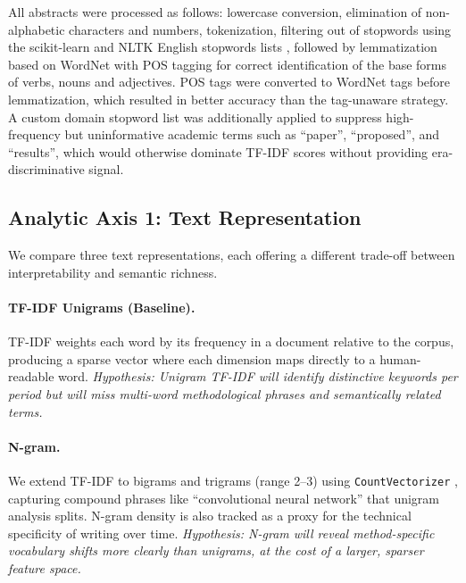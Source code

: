 \documentclass{article}
\begin{document}
All abstracts were processed as follows:
lowercase conversion, elimination of non-alphabetic
characters and numbers, tokenization, filtering out of
stopwords using the scikit-learn and NLTK English stopwords lists
\citep{scikit-learn, nltk}, followed by
lemmatization based on WordNet with POS tagging for correct
identification of the base forms of verbs, nouns and adjectives.
POS tags were converted to WordNet tags before
lemmatization, which resulted in better accuracy than
the tag-unaware strategy. A custom domain stopword list was additionally
applied to suppress high-frequency but uninformative
academic terms such as ``paper'', ``proposed'', and
``results'', which would otherwise dominate TF-IDF scores
without providing era-discriminative signal.

\subsection{Analytic Axis 1: Text Representation}
\label{subsec:representation}

We compare three text representations, each offering a
different trade-off between interpretability and semantic
richness.

\paragraph{TF-IDF Unigrams (Baseline).}
TF-IDF weights each word by its frequency in a document
relative to the corpus, producing a sparse vector where
each dimension maps directly to a human-readable word.
\textit{Hypothesis: Unigram TF-IDF will identify
distinctive keywords per period but will miss multi-word
methodological phrases and semantically related terms.}

\paragraph{N-gram.}
We extend TF-IDF to bigrams and trigrams (range 2--3)
using \texttt{CountVectorizer} \citep{scikit-learn},
capturing compound phrases like ``convolutional neural
network'' that unigram analysis splits. N-gram density
is also tracked as a proxy for the technical specificity
of writing over time.
\textit{Hypothesis: N-gram will reveal
method-specific vocabulary shifts more clearly than
unigrams, at the cost of a larger, sparser feature space.}
\end{document}
